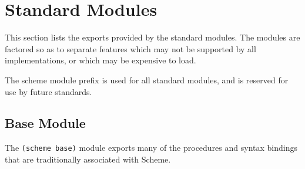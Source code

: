 \chapter{Standard Modules}
\label{stdmodules}

This section lists the exports provided by the standard modules.  The
modules are factored so as to separate features which may not be
supported by all implementations, or which may be expensive to load.

The {\cf scheme} module prefix is used for all standard modules, and
is reserved for use by future standards.

\section{Base Module}

The \texttt{(scheme base)} module exports many of the procedures and
syntax bindings that are traditionally associated with Scheme.

